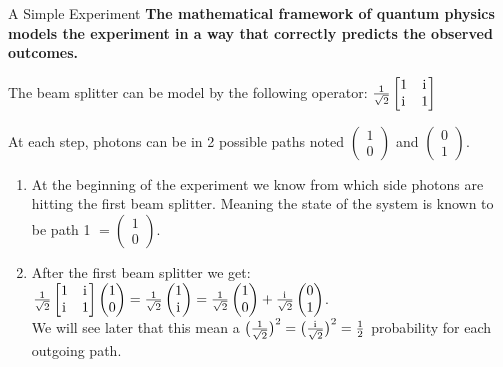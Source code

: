 \documentclass[svgnames,smaller,aspectratio=169]{beamer}
\begin{document}
\begin{frame}[fragile]{A Simple Experiment}
  \textbf{The mathematical framework of quantum physics models the experiment in a way that correctly predicts the
    observed outcomes.}

  The beam splitter can be model by the following operator:
  $\frac{1}{\sqrt{2}}\begin{bmatrix} 1 & \mathrm{i}\mkern1mu \\ \mathrm{i}\mkern1mu & 1 \end{bmatrix}$
  
  At each step, photons can be in 2 possible paths noted $\begin{pmatrix} 1 \\ 0 \end{pmatrix}$ and $\begin{pmatrix} 0 \\ 1 \end{pmatrix}$.

  \begin{enumerate}
  \item At the beginning of the experiment we know from which side photons are hitting the first beam splitter.
    Meaning the state of the system is known to be path 1 $= \begin{pmatrix} 1 \\ 0 \end{pmatrix}$.

  \item After the first beam splitter we get:
    $\frac{1}{\sqrt{2}}\begin{bmatrix} 1 & \mathrm{i}\mkern1mu \\ \mathrm{i}\mkern1mu & 1 \end{bmatrix} \begin{pmatrix} 1 \\ 0 \end{pmatrix} =
    \frac{1}{\sqrt{2}} \begin{pmatrix} 1 \\ \mathrm{i}\mkern1mu \end{pmatrix} =
    \frac{1}{\sqrt{2}} \begin{pmatrix} 1 \\ 0 \end{pmatrix} + \frac{\mathrm{i}\mkern1mu}{\sqrt{2}}\begin{pmatrix} 0 \\ 1 \end{pmatrix}$. \\
    We will see later that this mean a $\bigl(\frac{1}{\sqrt{2}}\bigr)^2= \bigl(\frac{\mathrm{i}\mkern1mu}{\sqrt{2}}\bigr)^2=\frac{1}{2}$ probability for each outgoing path.


\end{enumerate}
\end{frame}
\end{document}
